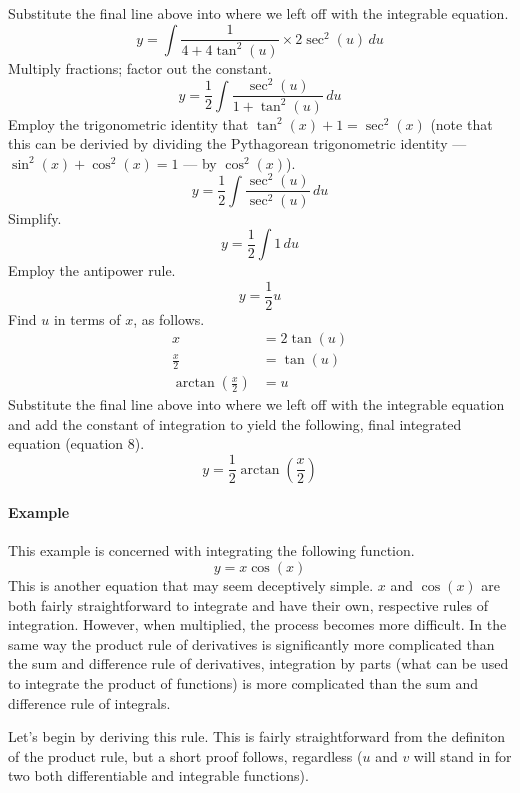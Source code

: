 \documentclass{article}
\newcounter{example}%
\newcommand{\ex}{\stepcounter{example} \paragraph{Example \theexample}}
\begin{document}
Substitute the final line above into where we left off with the integrable equation.
\begin{equation*}
    y=\int \frac{1}{4+4\tan^2(u)}\times 2\sec^2(u)\, du
\end{equation*}
Multiply fractions; factor out the constant.
\begin{equation*}
    y=\frac{1}{2}\int \frac{\sec^2(u)}{1+\tan^2(u)}\, du
\end{equation*}
Employ the trigonometric identity that $\tan^2(x)+1=\sec^2(x)$ (note that this can be derivied by dividing the Pythagorean trigonometric identity --- $\sin^2(x)+\cos^2(x)=1$ --- by $\cos^2(x)$).
\begin{equation*}
    y=\frac{1}{2}\int \frac{\sec^2(u)}{\sec^2(u)}\, du
\end{equation*}
Simplify.
\begin{equation*}
    y=\frac{1}{2}\int 1\, du
\end{equation*}
Employ the antipower rule.
\begin{equation*}
    y=\frac{1}{2}u
\end{equation*}
Find $u$ in terms of $x$, as follows.
\begin{align*}
    x &= 2\tan(u)\\
    \frac{x}{2} &= \tan(u)\\
    \arctan\left(\frac{x}{2}\right) &= u
\end{align*}
Substitute the final line above into where we left off with the integrable equation and add the constant of integration to yield the following, final integrated equation (equation 8).
\begin{equation}
    y=\frac{1}{2}\arctan\left(\frac{x}{2}\right)
\end{equation}
\ex This example is concerned with integrating the following function.$$y=x\cos(x)$$
This is another equation that may seem deceptively simple. $x$ and $\cos(x)$ are both fairly straightforward to integrate and have their own, respective rules of integration. However, when multiplied, the process becomes more difficult. In the same way the product rule of derivatives is significantly more complicated than the sum and difference rule of derivatives, integration by parts (what can be used to integrate the product of functions) is more complicated than the sum and difference rule of integrals.\par
Let's begin by deriving this rule. This is fairly straightforward from the definiton of the product rule, but a short proof follows, regardless ($u$ and $v$ will stand in for two both differentiable and integrable functions).
\end{document}
